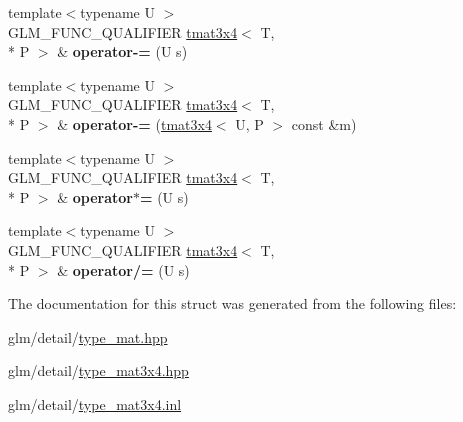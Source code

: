 \begin{DoxyCompactItemize}
\item 
\hypertarget{structglm_1_1tmat3x4_a15e2144679bbd267e558953161329d8e}{{\footnotesize template$<$typename U $>$ }\\G\-L\-M\-\_\-\-F\-U\-N\-C\-\_\-\-Q\-U\-A\-L\-I\-F\-I\-E\-R \hyperlink{structglm_1_1tmat3x4}{tmat3x4}$<$ T, \\*
P $>$ \& {\bfseries operator-\/=} (U s)}\label{structglm_1_1tmat3x4_a15e2144679bbd267e558953161329d8e}

\item 
\hypertarget{structglm_1_1tmat3x4_ad0445e23bd233b7c793c91519cf1c817}{{\footnotesize template$<$typename U $>$ }\\G\-L\-M\-\_\-\-F\-U\-N\-C\-\_\-\-Q\-U\-A\-L\-I\-F\-I\-E\-R \hyperlink{structglm_1_1tmat3x4}{tmat3x4}$<$ T, \\*
P $>$ \& {\bfseries operator-\/=} (\hyperlink{structglm_1_1tmat3x4}{tmat3x4}$<$ U, P $>$ const \&m)}\label{structglm_1_1tmat3x4_ad0445e23bd233b7c793c91519cf1c817}

\item 
\hypertarget{structglm_1_1tmat3x4_ada114a6d8a4f1b662be96a3e5e0bc910}{{\footnotesize template$<$typename U $>$ }\\G\-L\-M\-\_\-\-F\-U\-N\-C\-\_\-\-Q\-U\-A\-L\-I\-F\-I\-E\-R \hyperlink{structglm_1_1tmat3x4}{tmat3x4}$<$ T, \\*
P $>$ \& {\bfseries operator$\ast$=} (U s)}\label{structglm_1_1tmat3x4_ada114a6d8a4f1b662be96a3e5e0bc910}

\item 
\hypertarget{structglm_1_1tmat3x4_a2cf29af3f032cdab63648fb0d4776274}{{\footnotesize template$<$typename U $>$ }\\G\-L\-M\-\_\-\-F\-U\-N\-C\-\_\-\-Q\-U\-A\-L\-I\-F\-I\-E\-R \hyperlink{structglm_1_1tmat3x4}{tmat3x4}$<$ T, \\*
P $>$ \& {\bfseries operator/=} (U s)}\label{structglm_1_1tmat3x4_a2cf29af3f032cdab63648fb0d4776274}

\end{DoxyCompactItemize}


The documentation for this struct was generated from the following files\-:\begin{DoxyCompactItemize}
\item 
glm/detail/\hyperlink{type__mat_8hpp}{type\-\_\-mat.\-hpp}\item 
glm/detail/\hyperlink{type__mat3x4_8hpp}{type\-\_\-mat3x4.\-hpp}\item 
glm/detail/\hyperlink{type__mat3x4_8inl}{type\-\_\-mat3x4.\-inl}\end{DoxyCompactItemize}
